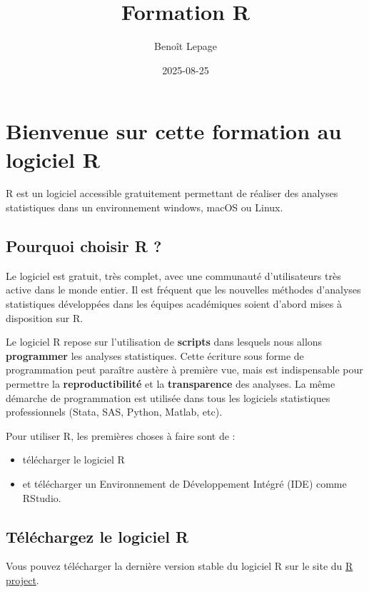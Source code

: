 \documentclass[
]{book}
\title{Formation R}
\author{Benoît Lepage}
\date{2025-08-25}
\providecommand{\tightlist}{%
  \setlength{\itemsep}{0pt}\setlength{\parskip}{0pt}}
\begin{document}
\maketitle

{
\setcounter{tocdepth}{1}
\tableofcontents
}
\chapter{Bienvenue sur cette formation au logiciel R}\label{bienvenue-sur-cette-formation-au-logiciel-r}

R est un logiciel accessible gratuitement permettant de réaliser des analyses statistiques dans un environnement windows, macOS ou Linux.

\section{Pourquoi choisir R ?}\label{pourquoi-choisir-r}

Le logiciel est gratuit, très complet, avec une communauté d'utilisateurs très active dans le monde entier. Il est fréquent que les nouvelles méthodes d'analyses statistiques développées dans les équipes académiques soient d'abord mises à disposition sur R.

Le logiciel R repose sur l'utilisation de \textbf{scripts} dans lesquels nous allons \textbf{programmer} les analyses statistiques. Cette écriture sous forme de programmation peut paraître austère à première vue, mais est indispensable pour permettre la \textbf{reproductibilité} et la \textbf{transparence} des analyses. La même démarche de programmation est utilisée dans tous les logiciels statistiques professionnels (Stata, SAS, Python, Matlab, etc).

Pour utiliser R, les premières choses à faire sont de :

\begin{itemize}
\tightlist
\item
  télécharger le logiciel R
\item
  et télécharger un Environnement de Développement Intégré (IDE) comme RStudio.
\end{itemize}

\section{Téléchargez le logiciel R}\label{tuxe9luxe9chargez-le-logiciel-r}

Vous pouvez télécharger la dernière version stable du logiciel R sur le site du \href{https://www.r-project.org/}{R project}.
\end{document}
